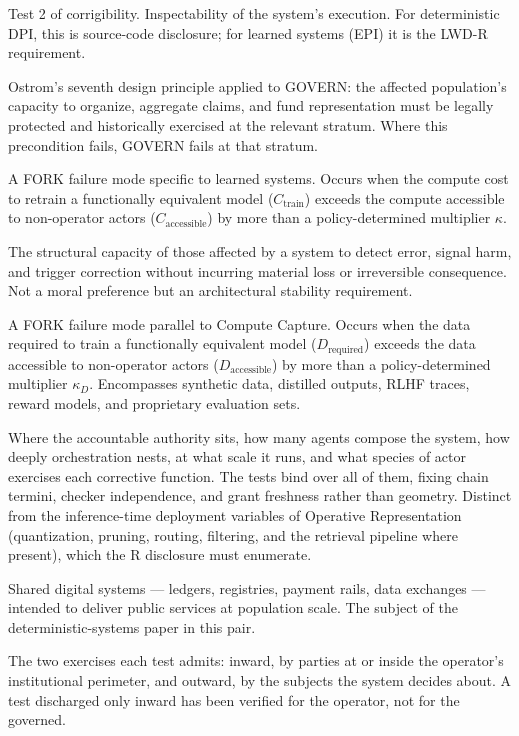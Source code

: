 \begin{description}[style=nextline, leftmargin=1.5em, font=\normalfont\bfseries]
Test 2 of corrigibility. Inspectability of the system's execution.
For deterministic DPI, this is source-code disclosure; for learned
systems (EPI) it is the LWD-R requirement.

Ostrom's seventh design principle applied to GOVERN: the affected
population's capacity to organize, aggregate claims, and fund
representation must be legally protected and historically exercised at
the relevant stratum. Where this precondition fails, GOVERN fails at
that stratum.

A FORK failure mode specific to learned systems. Occurs when the
compute cost to retrain a functionally equivalent model
($C_{\text{train}}$) exceeds the compute accessible to non-operator
actors ($C_{\text{accessible}}$) by more than a policy-determined
multiplier $\kappa$.

The structural capacity of those affected by a system to detect error,
signal harm, and trigger correction without incurring material loss
or irreversible consequence. Not a moral preference but an
architectural stability requirement.

A FORK failure mode parallel to Compute Capture. Occurs when the data
required to train a functionally equivalent model
($D_{\text{required}}$) exceeds the data accessible to non-operator
actors ($D_{\text{accessible}}$) by more than a policy-determined
multiplier $\kappa_D$. Encompasses synthetic data, distilled outputs,
RLHF traces, reward models, and proprietary evaluation sets.

Where the accountable authority sits, how many agents compose the
system, how deeply orchestration nests, at what scale it runs, and what
species of actor exercises each corrective function. The tests bind
over all of them, fixing chain termini, checker independence, and grant
freshness rather than geometry. Distinct from the inference-time
deployment variables of Operative Representation (quantization, pruning,
routing, filtering, and the retrieval pipeline where present), which
the R disclosure must enumerate.

Shared digital systems --- ledgers, registries, payment rails, data
exchanges --- intended to deliver public services at population scale.
The subject of the deterministic-systems paper in this pair.

The two exercises each test admits: inward, by parties at or inside the
operator's institutional perimeter, and outward, by the subjects the
system decides about. A test discharged only inward has been verified
for the operator, not for the governed.


\end{description}
